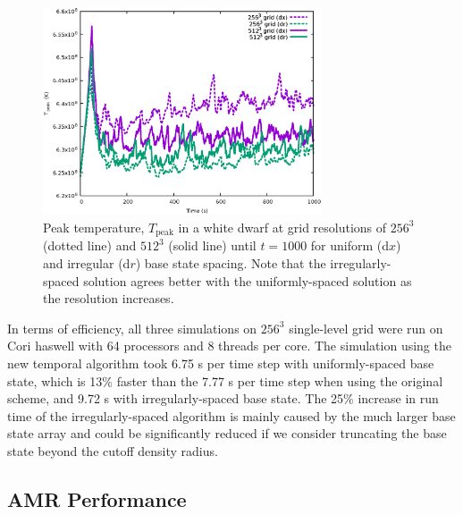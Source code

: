 \begin{figure}[hbt]
\begin{center}
\includegraphics[width=3.25in]{./figs/wdconvect_compare_Tmax}
\caption{\label{fig:wdconvect_Tmax} Peak temperature, $T_{\text{peak}}$  in a white dwarf at grid resolutions of 
         $256^3$ (dotted line) and $512^3$ (solid line) until $t=1000$ for uniform (d$x$) and irregular (d$r$) base state spacing. 
         Note that the irregularly-spaced solution agrees better 
         with the uniformly-spaced solution as the resolution increases.}
\end{center}
\end{figure}

In terms of efficiency, all three simulations on $256^3$ single-level grid were run on Cori haswell with 64 processors and 8 threads per core. The simulation using the new temporal algorithm took 6.75 s per time step with uniformly-spaced base state, which is 13\% faster than the 7.77 s per time step when using the original scheme, and 9.72 s with irregularly-spaced base state. The 25\% increase in run time of the irregularly-spaced algorithm is mainly caused by the much larger base state array and could be significantly reduced if we consider truncating the base state beyond the cutoff density radius. 



\subsection{AMR Performance}

